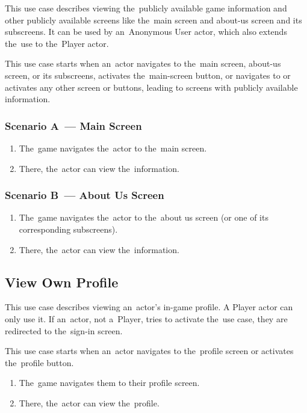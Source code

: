 This use case describes viewing the~publicly available game information and other publicly available screens like the~main screen and about-us screen and its subscreens.
It can be used by an~Anonymous User actor, which also extends the~use to the~Player actor.

This use case starts when an~actor navigates to the~main screen, about-us screen, or its subscreens, activates the~main-screen button, or navigates to or activates any other screen or buttons, leading to screens with publicly available information.

\subsubsection*{Scenario A~--- Main Screen}

\begin{enumerate}
    \item The~game navigates the~actor to the~main screen.
    \item There, the~actor can view the~information.
\end{enumerate}

\subsubsection*{Scenario B~--- About Us Screen}

\begin{enumerate}
    \item The~game navigates the~actor to the~about us screen (or one of its corresponding subscreens).
    \item There, the~actor can view the~information.
\end{enumerate}

\subsection{View Own Profile}

This use case describes viewing an~actor's in-game profile.
A Player actor can only use it.
If an~actor, not a~Player, tries to activate the~use case, they are redirected to the~sign-in screen.

This use case starts when an~actor navigates to the~profile screen or activates the~profile button.

\begin{enumerate}
    \item The~game navigates them to their profile screen.
    \item There, the~actor can view the~profile.
\end{enumerate}

